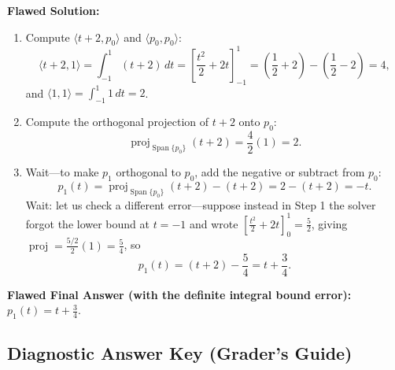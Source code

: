 \documentclass[11pt, letterpaper]{article}
\theoremstyle{definition}
\theoremstyle{remark}
\begin{document}
\textbf{Flawed Solution:}
\begin{enumerate}
    \item Compute $\langle t + 2, p_0 \rangle$ and $\langle p_0, p_0 \rangle$:
    \[
        \langle t + 2, 1 \rangle = \int_{-1}^1 (t + 2)\,dt = \left[\frac{t^2}{2} + 2t\right]_{-1}^1 = \left(\frac{1}{2} + 2\right) - \left(\frac{1}{2} - 2\right) = 4,
    \]
    and $\langle 1, 1 \rangle = \int_{-1}^1 1\,dt = 2$.
    \item Compute the orthogonal projection of $t + 2$ onto $p_0$:
    \[
        \operatorname{proj}_{\operatorname{Span}\{p_0\}} (t + 2) = \frac{4}{2}(1) = 2.
    \]
    \item Wait—to make $p_1$ orthogonal to $p_0$, add the negative or subtract from $p_0$:
    \[
        p_1(t) = \operatorname{proj}_{\operatorname{Span}\{p_0\}}(t + 2) - (t + 2) = 2 - (t + 2) = -t.
    \]
    Wait: let us check a different error—suppose instead in Step 1 the solver forgot the lower bound at $t = -1$ and wrote $\left[\frac{t^2}{2} + 2t\right]_0^1 = \frac{5}{2}$, giving $\operatorname{proj} = \frac{5/2}{2}(1) = \frac{5}{4}$, so
    \[
        p_1(t) = (t + 2) - \frac{5}{4} = t + \frac{3}{4}.
    \]
\end{enumerate}
\textbf{Flawed Final Answer (with the definite integral bound error):} $\displaystyle p_1(t) = t + \frac{3}{4}$.

\subsection{Diagnostic Answer Key (Grader's Guide)}
\end{document}
